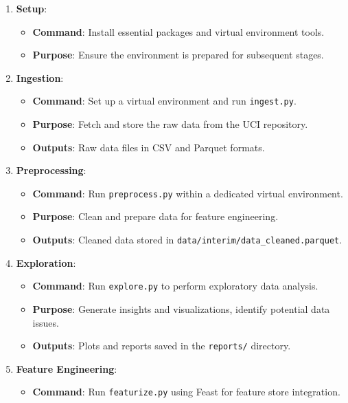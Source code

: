\documentclass{article}
\begin{document}
\begin{enumerate}[leftmargin=*]
    \item \textbf{Setup}:
        \begin{itemize}[leftmargin=*]
            \item \textbf{Command}: Install essential packages and virtual environment tools.
            \item \textbf{Purpose}: Ensure the environment is prepared for subsequent stages.
        \end{itemize}
    \item \textbf{Ingestion}:
        \begin{itemize}[leftmargin=*]
            \item \textbf{Command}: Set up a virtual environment and run \texttt{ingest.py}.
            \item \textbf{Purpose}: Fetch and store the raw data from the UCI repository.
            \item \textbf{Outputs}: Raw data files in CSV and Parquet formats.
        \end{itemize}
    \item \textbf{Preprocessing}:
        \begin{itemize}[leftmargin=*]
            \item \textbf{Command}: Run \texttt{preprocess.py} within a dedicated virtual environment.
            \item \textbf{Purpose}: Clean and prepare data for feature engineering.
            \item \textbf{Outputs}: Cleaned data stored in \texttt{data/interim/data\_cleaned.parquet}.
        \end{itemize}
    \item \textbf{Exploration}:
        \begin{itemize}[leftmargin=*]
            \item \textbf{Command}: Run \texttt{explore.py} to perform exploratory data analysis.
            \item \textbf{Purpose}: Generate insights and visualizations, identify potential data issues.
            \item \textbf{Outputs}: Plots and reports saved in the \texttt{reports/} directory.
        \end{itemize}
    \item \textbf{Feature Engineering}:
        \begin{itemize}[leftmargin=*]
            \item \textbf{Command}: Run \texttt{featurize.py} using Feast for feature store integration.

\end{itemize}
\end{enumerate}
\end{document}
